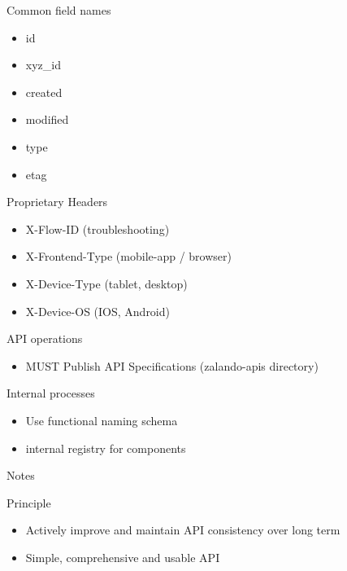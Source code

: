 \documentclass[10pt]{beamer}
\begin{document}
\begin{frame}{Common field names}

  \begin{itemize}

    \item
          id
    \item
          xyz\_id
    \item
          created
    \item
          modified
    \item
          type
    \item
          etag
  \end{itemize}

\end{frame}

\begin{frame}{Proprietary Headers}

  \begin{itemize}

    \item
          X-Flow-ID (troubleshooting)
    \item
          X-Frontend-Type (mobile-app / browser)
    \item
          X-Device-Type (tablet, desktop)
    \item
          X-Device-OS (IOS, Android)
  \end{itemize}

\end{frame}

\begin{frame}{API operations}

  \begin{itemize}

    \item
          MUST Publish API Specifications (zalando-apis directory)
  \end{itemize}

\end{frame}

\begin{frame}{Internal processes}

  \begin{itemize}

    \item
          Use functional naming schema
    \item
          internal registry for components
  \end{itemize}

\end{frame}

\begin{frame}{Notes}

  \begin{block}{Principle}

    \begin{itemize}

      \item
            Actively improve and maintain API consistency over long term
      \item
            Simple, comprehensive and usable API
    \end{itemize}

  \end{block}

\end{frame}
\end{document}
